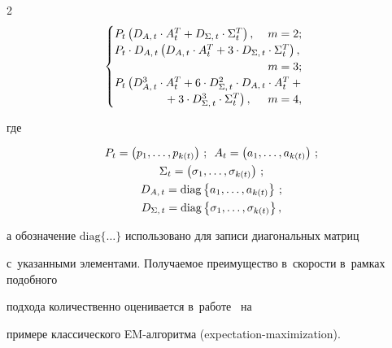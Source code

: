 \begin{multicols}{2}
\begin{equation*}
\begin{cases}
P_t\left(D_{A,\,t}\cdot A_t^T + D_{\Sigma,\,t} \cdot \Sigma_t^T\right), & \hspace*{-15mm}m=2;\\

P_t\cdot D_{A,\,t}\left(D_{A,\,t}\cdot A_t^T+3\cdot D_{\Sigma,\,t}\cdot\Sigma_t^T\right),\\

 & \hspace*{-15mm}m=3;\\

P_t\left( D_{A,\,t}^3\cdot A_t^T +6\cdot D_{\Sigma,\,t}^2\cdot D_{A,\,t}\cdot A_t^T+{}\right.&\\

\hspace*{15mm}\left.{}+3\cdot D_{\Sigma,\,t}^3\cdot\Sigma_t^T\right), & \hspace*{-15mm}m=4,

\end{cases}


\end{equation*}

где

\begin{gather*}

P_t=\left(p_1,\ldots,p_{k(t)}\right)\,;\enskip

A_t=\left(a_1,\ldots,a_{k(t)}\right)\,;\\

\Sigma_t=\left(\sigma_1,\ldots,\sigma_{k(t)}\right)\,; \\

D_{A,\,t}=\mathrm{diag}\left\{a_1,\ldots,a_{k(t)}\right\}\,;\\

D_{\Sigma,\,t}=\mathrm{diag}\left\{\sigma_1,\ldots,\sigma_{k(t)}\right\},

\end{gather*}

а обозначение $\mathrm{diag}\{\ldots\}$ использовано для записи диагональных матриц 

с~указанными элементами. Получаемое преимущество в~скорости в~рамках подобного 

подхода количественно оценивается в~работе~\cite{Gorshenin2015a} на 

примере классического EM-ал\-го\-ритма  (expectation-maximization).



\vspace*{-6pt}




\end{multicols}
